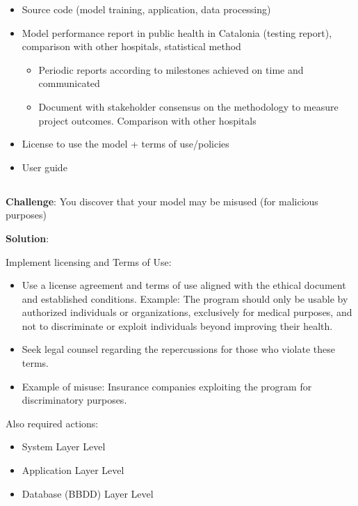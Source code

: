 \begin{itemize}
    \item Source code (model training, application, data processing)

    \item Model performance report in public health in Catalonia (testing report), comparison with other hospitals, statistical method
    \begin{itemize}
        \item Periodic reports according to milestones achieved on time and communicated
        \item Document with stakeholder consensus on the methodology to measure project outcomes. Comparison with other hospitals
    \end{itemize}

    \item License to use the model + terms of use/policies

    \item User guide
\end{itemize}

\newpage
\subsection*{}
\begin{warning}
    \textbf{Challenge}: You discover that your model may be misused (for malicious purposes)

    \textbf{Solution}:

    Implement licensing and Terms of Use:

    \begin{itemize}
        \item Use a license agreement and terms of use aligned with the ethical document and established conditions. Example: The program should only be usable by authorized individuals or organizations, exclusively for medical purposes, and not to discriminate or exploit individuals beyond improving their health.
        \item Seek legal counsel regarding the repercussions for those who violate these terms.
        \item Example of misuse: Insurance companies exploiting the program for discriminatory purposes.
    \end{itemize}

    Also required actions:
    \begin{itemize}
        \item System Layer Level
        \item Application Layer Level
        \item Database (BBDD) Layer Level
    \end{itemize}
\end{warning}
